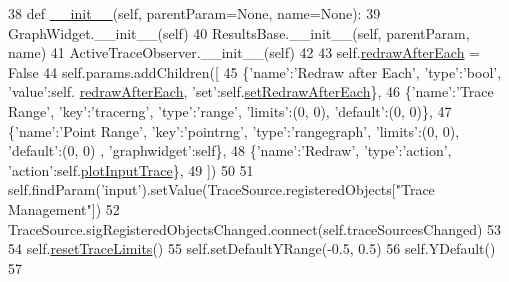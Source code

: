 \begin{DoxyCode}
38     \textcolor{keyword}{def }\hyperlink{classsoftware_1_1chipwhisperer_1_1common_1_1results_1_1waveform__widget_1_1WaveFormWidget_aaca9b6d34808f541cdeaff2a0db1f5fc}{\_\_init\_\_}(self, parentParam=None, name=None):
39         GraphWidget.\_\_init\_\_(self)
40         ResultsBase.\_\_init\_\_(self, parentParam, name)
41         ActiveTraceObserver.\_\_init\_\_(self)
42 
43         self.\hyperlink{classsoftware_1_1chipwhisperer_1_1common_1_1results_1_1waveform__widget_1_1WaveFormWidget_a1ab3d2b50abef54a20f88960c8cc1a10}{redrawAfterEach} = \textcolor{keyword}{False}
44         self.params.addChildren([
45             \{\textcolor{stringliteral}{'name'}:\textcolor{stringliteral}{'Redraw after Each'}, \textcolor{stringliteral}{'type'}:\textcolor{stringliteral}{'bool'}, \textcolor{stringliteral}{'value'}:self.
      \hyperlink{classsoftware_1_1chipwhisperer_1_1common_1_1results_1_1waveform__widget_1_1WaveFormWidget_a1ab3d2b50abef54a20f88960c8cc1a10}{redrawAfterEach}, \textcolor{stringliteral}{'set'}:self.\hyperlink{classsoftware_1_1chipwhisperer_1_1common_1_1results_1_1waveform__widget_1_1WaveFormWidget_a30d46f17faf50a747d563441d90d0a6c}{setRedrawAfterEach}\},
46             \{\textcolor{stringliteral}{'name'}:\textcolor{stringliteral}{'Trace Range'}, \textcolor{stringliteral}{'key'}:\textcolor{stringliteral}{'tracerng'}, \textcolor{stringliteral}{'type'}:\textcolor{stringliteral}{'range'}, \textcolor{stringliteral}{'limits'}:(0, 0), \textcolor{stringliteral}{'default'}:(0, 0)\},
47             \{\textcolor{stringliteral}{'name'}:\textcolor{stringliteral}{'Point Range'}, \textcolor{stringliteral}{'key'}:\textcolor{stringliteral}{'pointrng'}, \textcolor{stringliteral}{'type'}:\textcolor{stringliteral}{'rangegraph'}, \textcolor{stringliteral}{'limits'}:(0, 0), \textcolor{stringliteral}{'default'}:(0, 0)
      , \textcolor{stringliteral}{'graphwidget'}:self\},
48             \{\textcolor{stringliteral}{'name'}:\textcolor{stringliteral}{'Redraw'}, \textcolor{stringliteral}{'type'}:\textcolor{stringliteral}{'action'}, \textcolor{stringliteral}{'action'}:self.\hyperlink{classsoftware_1_1chipwhisperer_1_1common_1_1results_1_1waveform__widget_1_1WaveFormWidget_ad647aa0ea34bda73fec2c2e1695720d8}{plotInputTrace}\},
49         ])
50 
51         self.findParam(\textcolor{stringliteral}{'input'}).setValue(TraceSource.registeredObjects[\textcolor{stringliteral}{"Trace Management"}])
52         TraceSource.sigRegisteredObjectsChanged.connect(self.traceSourcesChanged)
53 
54         self.\hyperlink{classsoftware_1_1chipwhisperer_1_1common_1_1results_1_1waveform__widget_1_1WaveFormWidget_a5d0b52d0e854e36ced61f90547daef63}{resetTraceLimits}()
55         self.setDefaultYRange(-0.5, 0.5)
56         self.YDefault()
57 
\end{DoxyCode}


